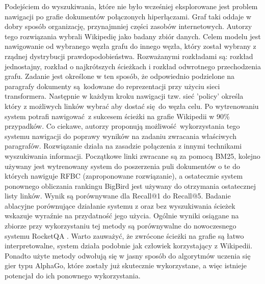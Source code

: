 Podejściem do wyszukiwania, które nie było wcześniej eksplorowane jest problem nawigacji po grafie dokumentów połączonych hiperłączami. Graf taki oddaje w dobry sposób organizację, przynajmniej części zasobów internetowych. Autorzy tego rozwiązania wybrali Wikipedię jako badany zbiór danych. Celem modelu jest nawigowanie od wybranego węzła grafu do innego węzła, który został wybrany z rządnej dystrybucji prawdopodobieństwa. Rozważanymi rozkładami są: rozkład jednostajny, rozkład o najkrótszych ścieżkach i rozkład odwrotnego przechodzenia grafu. Zadanie jest określone w ten sposób, że odpowiednio podzielone na paragrafy dokumenty są kodowane do reprezentacji przy użyciu sieci transformera. Następnie w każdym kroku nawigacji tzw. sieć 'policy' określa który z możliwych linków wybrać aby dostać się do węzła celu. 
Po wytrenowaniu system potrafi nawigować z sukcesem ścieżki na grafie Wikipedii w 90\% przypadków. Co ciekawe, autorzy proponują możliwość wykorzystania tego systemu nawigacji do poprawy wyników na zadaniu zwracania właściwych paragrafów. Rozwiązanie działa na zasadzie połączenia z innymi technikami wyszukiwania informacji. Początkowe linki zwracane są za pomocą BM25, kolejno używany jest wytrenowany system do poszerzenia puli dokumentów o te do których nawiguje RFBC (zaproponowane rozwiązanie), a ostatecznie system ponownego obliczania rankingu BigBird jest używany do otrzymania ostatecznej listy linków. Wynik są porównywane dla Recall@1 do Recall@5. Badanie ablacyjne porównujące działanie systemu z oraz bez wyszukiwania ścieżek wskazuje wyraźnie na przydatność jego użycia. Ogólnie wyniki osiągane na zbiorze przy wykorzystaniu tej metody są porównywalne do nowoczesnego systemu RocketQA \autocite{zaheer2022learning}. Warto zauważyć, że zwrócone ścieżki na grafie są łatwo interpretowalne, system działa podobnie jak człowiek korzystający z Wikipedii. Ponadto użyte metody odwołują się w jasny sposób do algorytmów uczenia się gier typu AlphaGo, które zostały już skutecznie wykorzystane, a więc istnieje potencjał do ich ponownego wykorzystania.